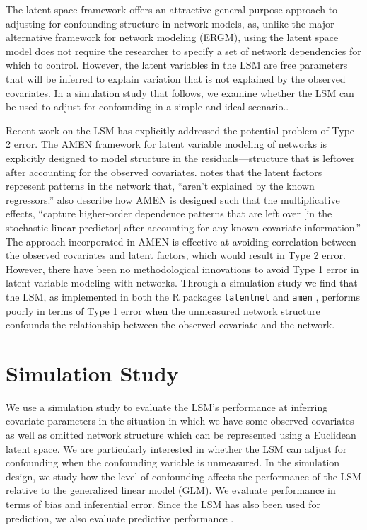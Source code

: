 \documentclass[11pt]{article}
\begin{document}
The latent space framework offers an attractive general purpose approach to adjusting for confounding structure in network models, as, unlike the major alternative framework for network modeling (ERGM), using the latent space model does not require the researcher to specify a set of network dependencies for which to control.  However, the latent variables in the LSM are free parameters that will be inferred to explain variation that is not explained by the observed covariates. In a simulation study that follows, we examine whether the LSM can be used to adjust for confounding in a simple and ideal scenario..


Recent work on the LSM has explicitly addressed the potential problem
of Type 2 error. The AMEN framework for latent variable modeling of
networks is explicitly designed to model structure in the
residuals---structure that is leftover after accounting for the
observed covariates. \citet[p. 43]{hoff2015dyadic} notes that the
latent factors represent patterns in the network that, ``aren't
explained by the known regressors.''
\citet[pp. 12--13]{minhas2016inferential} also describe how AMEN is
designed such that the multiplicative effects, ``capture higher-order
dependence patterns that are left over [in the stochastic linear
  predictor] after accounting for any known covariate information.''
The approach incorporated in AMEN is effective at avoiding correlation
between the observed covariates and latent factors, which would result
in Type 2 error. However, there have been no methodological
innovations to avoid Type 1 error in latent variable modeling with
networks. Through a simulation study we find that the LSM, as
implemented in both the R \citep{R} packages \texttt{latentnet}
\citep{latentnet} and \texttt{amen} \citep{amen}, performs poorly in
terms of Type 1 error when the unmeasured network structure confounds
the relationship between the observed covariate and the network.


\section{Simulation Study}

We use a simulation study to evaluate the LSM's performance at
inferring covariate parameters in the situation in which we have some
observed covariates as well as omitted network structure which can be
represented using a Euclidean latent space. We are particularly
interested in whether the LSM can adjust for confounding when the
confounding variable is unmeasured. In the simulation design, we study
how the level of confounding affects the performance of the LSM
relative to the generalized linear model (GLM). We evaluate performance in terms of bias and
inferential error. Since the LSM has also been used for prediction,  we also evaluate predictive performance
\citep[e.g., ]{ward2013gravity, fletcher2011social, fletcher2013network,
  chiu2011unifying}.
\end{document}
